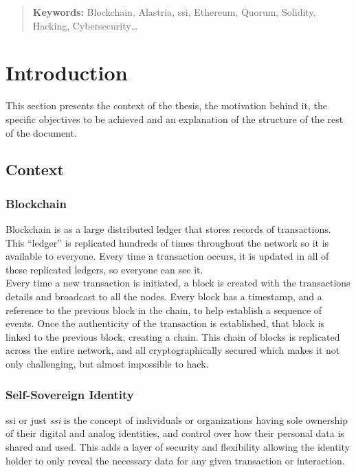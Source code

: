 \documentclass[a4paper, 12pt]{article} %
\begin{document}
\newpage

\begin{abstract}
    \normalsize
    
    \textbf{Keywords:} Blockchain, Alastria, \acrlong{ssi}, Ethereum, Quorum, Solidity, Hacking, Cybersecurity\ldots
\end{abstract}

\newpage
{} %
\UseRawInputEncoding %

\section{Introduction}
    This section presents the context of the thesis, the motivation behind it, the specific objectives to be achieved and an explanation of the structure of the rest of the document.
    
    \subsection{Context}
        \subsubsection{Blockchain}
            Blockchain\cite{blockchain-sum}\cite{blockchainGartner} is as a large distributed ledger that stores records of transactions. This “ledger” is replicated hundreds of times throughout the network so it is available to everyone. Every time a transaction occurs, it is updated in all of these replicated ledgers, so everyone can see it.\\
            
            Every time a new transaction is initiated, a block is created with the transactions details and broadcast to all the nodes. Every block has a timestamp, and a reference to the previous block in the chain, to help establish a sequence of events. Once the authenticity of the transaction is established, that block is linked to the previous block, creating a chain. This chain of blocks is replicated across the entire network, and all cryptographically secured which makes it not only challenging, but almost impossible to hack.
            
        \subsubsection{Self-Sovereign Identity}
            \acrlong{ssi} or just \textit{\acrshort{ssi}}\cite{ssi} is the concept of individuals or organizations having sole ownership of their digital and analog identities, and control over how their personal data is shared and used. This adds a layer of security and flexibility allowing the identity holder to only reveal the necessary data for any given transaction or interaction.\\
            
\end{document}
